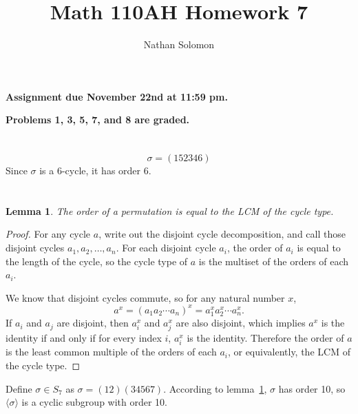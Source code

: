 \documentclass[12pt]{article}
\newtheorem{lem}[thm]{Lemma}
\begin{document}
\title{Math 110AH Homework 7}
\author{Nathan Solomon}
\maketitle

\textbf{Assignment due November 22nd at 11:59 pm.}
\par
\textbf{Problems 1, 3, 5, 7, and 8 are graded.}

\section{}
\noindent{}\bigskip

\[ \sigma = (152346) \]
Since $\sigma$ is a 6-cycle, it has order 6.

\section{}
\noindent{}\bigskip

\begin{lem}\label{lcm_cycles}
    The order of a permutation is equal to the LCM of the cycle type.
\end{lem}
\begin{proof}
    For any cycle $a$, write out the disjoint cycle decomposition, and call those disjoint cycles $a_1, a_2, \dots, a_n$. For each disjoint cycle $a_i$, the order of $a_i$ is equal to the length of the cycle, so the cycle type of $a$ is the multiset of the orders of each $a_i$.
    \par
    We know that disjoint cycles commute, so for any natural number $x$,
    \[ a^x = (a_1 a_2 \cdots a_n)^x = a_1^x a_2^x \cdots a_n^x. \]
    If $a_i$ and $a_j$ are disjoint, then $a_i^x$ and $a_j^x$ are also disjoint, which implies $a^x$ is the identity if and only if for every index $i$, $a_i^x$ is the identity. Therefore the order of $a$ is the least common multiple of the orders of each $a_i$, or equivalently, the LCM of the cycle type.
\end{proof}

Define $\sigma \in S_7$ as $\sigma = (12)(34567)$. According to lemma~\ref{lcm_cycles}, $\sigma$ has order 10, so $\langle \sigma \rangle$ is a cyclic subgroup with order 10.
\end{document}
